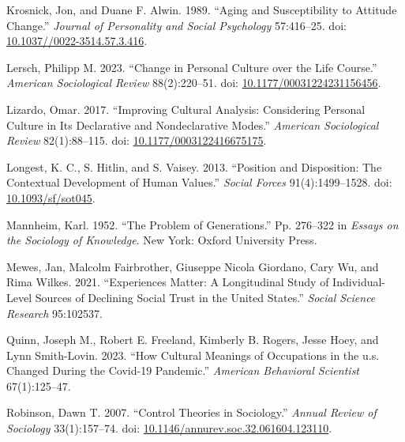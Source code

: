 \documentclass[
  12pt,
]{article}
\newlength{\cslhangindent}
\newlength{\cslentryspacingunit} %
\newenvironment{CSLReferences}[2] %
 {%
  \setlength{\parindent}{0pt}
  \ifodd #1
  \let\oldpar\par
  \def\par{\hangindent=\cslhangindent\oldpar}
  \fi
  \setlength{\parskip}{#2\cslentryspacingunit}
 }%
 {}
\begin{document}
\begin{CSLReferences}{1}{0}
\leavevmode{}%
Krosnick, Jon, and Duane F. Alwin. 1989. {``Aging and {Susceptibility}
to {Attitude} {Change}.''} \emph{Journal of Personality and Social
Psychology} 57:416--25. doi:
\href{https://doi.org/10.1037//0022-3514.57.3.416}{10.1037//0022-3514.57.3.416}.

\leavevmode{}%
Lersch, Philipp M. 2023. {``Change in {Personal} {Culture} over the
{Life} {Course}.''} \emph{American Sociological Review} 88(2):220--51.
doi:
\href{https://doi.org/10.1177/00031224231156456}{10.1177/00031224231156456}.

\leavevmode{}%
Lizardo, Omar. 2017. {``Improving {Cultural} {Analysis}: {Considering}
{Personal} {Culture} in Its {Declarative} and {Nondeclarative}
{Modes}.''} \emph{American Sociological Review} 82(1):88--115. doi:
\href{https://doi.org/10.1177/0003122416675175}{10.1177/0003122416675175}.

\leavevmode{}%
Longest, K. C., S. Hitlin, and S. Vaisey. 2013. {``Position and
{Disposition}: {The} {Contextual} {Development} of {Human} {Values}.''}
\emph{Social Forces} 91(4):1499--1528. doi:
\href{https://doi.org/10.1093/sf/sot045}{10.1093/sf/sot045}.

\leavevmode{}%
Mannheim, Karl. 1952. {``The {Problem} of {Generations}.''} Pp. 276--322
in \emph{Essays on the {Sociology} of {Knowledge}}. New York: Oxford
University Press.

\leavevmode{}%
Mewes, Jan, Malcolm Fairbrother, Giuseppe Nicola Giordano, Cary Wu, and
Rima Wilkes. 2021. {``Experiences Matter: A Longitudinal Study of
Individual-Level Sources of Declining Social Trust in the United
States.''} \emph{Social Science Research} 95:102537.

\leavevmode{}%
Quinn, Joseph M., Robert E. Freeland, Kimberly B. Rogers, Jesse Hoey,
and Lynn Smith-Lovin. 2023. {``How Cultural Meanings of Occupations in
the u.s. Changed During the Covid-19 Pandemic.''} \emph{American
Behavioral Scientist} 67(1):125--47.

\leavevmode{}%
Robinson, Dawn T. 2007. {``Control {Theories} in {Sociology}.''}
\emph{Annual Review of Sociology} 33(1):157--74. doi:
\href{https://doi.org/10.1146/annurev.soc.32.061604.123110}{10.1146/annurev.soc.32.061604.123110}.


\end{CSLReferences}
\end{document}
